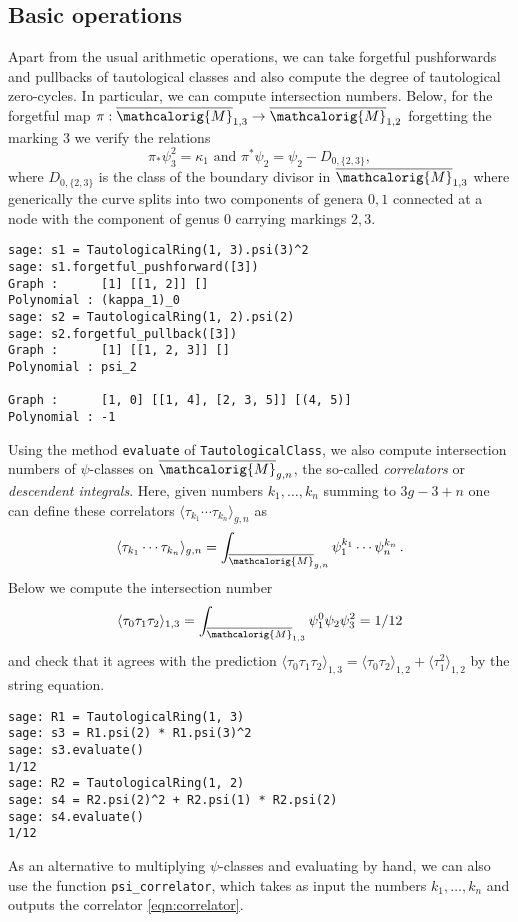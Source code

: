 \documentclass[11pt]{article}
\newcommand{\M}{\ensuremath{\overline{\mathcalorig{M}}}}
\begin{document}
\subsection{Basic operations} \label{Sect:Basicop}
Apart from the usual arithmetic operations, we can take forgetful pushforwards and pullbacks of tautological classes and also compute the degree of tautological zero-cycles. In particular, we can compute intersection numbers. Below, for the forgetful map $\pi: \M_{1,3} \to \M_{1,2}$ forgetting the marking $3$ we verify the relations
\[\pi_* \psi_3^2 = \kappa_1 \text{ and } \pi^* \psi_2 = \psi_2 - D_{0,\{2,3\}},\]
where $D_{0,\{2,3\}}$ is the class of the boundary divisor in $\M_{1,3}$ where generically the curve splits into two components of genera $0,1$ connected at a node with the component of genus $0$ carrying markings $2,3$.
\begin{lstlisting}
sage: s1 = TautologicalRing(1, 3).psi(3)^2
sage: s1.forgetful_pushforward([3])
Graph :      [1] [[1, 2]] []
Polynomial : (kappa_1)_0
sage: s2 = TautologicalRing(1, 2).psi(2)
sage: s2.forgetful_pullback([3])
Graph :      [1] [[1, 2, 3]] []
Polynomial : psi_2

Graph :      [1, 0] [[1, 4], [2, 3, 5]] [(4, 5)]
Polynomial : -1
\end{lstlisting}
Using the method \texttt{evaluate} of \texttt{TautologicalClass}, we also compute intersection numbers of $\psi$-classes on $\M_{g,n}$, the so-called \emph{correlators} or \emph{descendent integrals}. Here, given numbers $k_1, \ldots, k_n$ summing to $3g-3+n$ one can define these correlators $\langle \tau_{k_1} \cdots \tau_{k_n}\rangle_{g,n}$ as
\begin{equation} \label{eqn:correlator}
\langle \tau_{k_1} \cdots \tau_{k_n}\rangle_{g,n} = \int_{\M_{g,n}} \psi_1^{k_1} \cdots \psi_n^{k_n}\,.
\end{equation}
Below we compute the intersection number
\[\langle \tau_0 \tau_1 \tau_2 \rangle_{1,3} = \int_{\M_{1,3}} \psi_1^0 \psi_2 \psi_3^2 = 1/12\]
and check that it agrees with the prediction $\langle \tau_0 \tau_1 \tau_2 \rangle_{1,3} = \langle \tau_0 \tau_2 \rangle_{1,2} +\langle \tau_1 ^2 \rangle_{1,2}$ by the string equation.
\begin{lstlisting}
sage: R1 = TautologicalRing(1, 3)
sage: s3 = R1.psi(2) * R1.psi(3)^2
sage: s3.evaluate()
1/12
sage: R2 = TautologicalRing(1, 2)
sage: s4 = R2.psi(2)^2 + R2.psi(1) * R2.psi(2)
sage: s4.evaluate()
1/12
\end{lstlisting}
As an alternative to multiplying $\psi$-classes and evaluating by hand, we can also use the function \texttt{psi\_correlator}, which takes as input the numbers $k_1, \ldots, k_n$ and outputs the correlator \eqref{eqn:correlator}.
\end{document}
